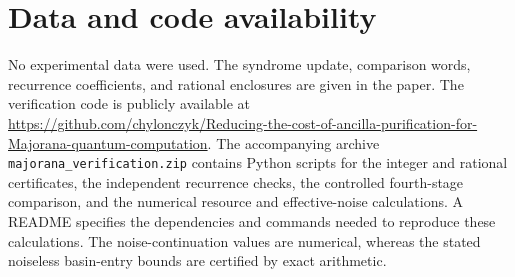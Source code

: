 \section*{Data and code availability}
No experimental data were used. The syndrome update, comparison words,
recurrence coefficients, and rational enclosures are given in the paper.
The verification code is publicly available at
\url{https://github.com/chylonczyk/Reducing-the-cost-of-ancilla-purification-for-Majorana-quantum-computation}.
The accompanying archive \texttt{majorana\_verification.zip} contains
Python scripts for the integer and rational certificates, the
independent recurrence checks, the controlled fourth-stage comparison,
and the numerical resource and effective-noise calculations. A README
specifies the dependencies and commands needed to reproduce these
calculations. The noise-continuation values are numerical, whereas the
stated noiseless basin-entry bounds are certified by exact arithmetic.
